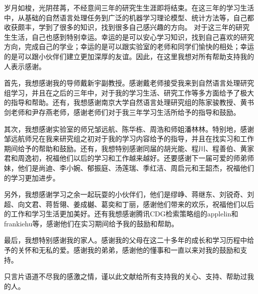 \documentclass[master]{njuthesis}
\begin{document}
\begin{acknowledgement}


岁月如梭，光阴荏苒，不经意间三年的研究生生涯即将结束。在这三年的学习生活中，从基础的自然语言处理任务到广泛的机器学习理论模型、统计方法等，自己都收获颇丰，学到了很多的知识，找到很多自己感兴趣的方向。 对于这三年的研究生生活，自己也感到特别幸运。幸运的是可以安心学习知识，找到自己喜欢的研究方向，完成自己的学业；幸运的是可以跟实验室的老师和同学们愉快的相处；幸运的是可以跟小伙伴们建立更加深厚的友谊。因此，在这里我想对所有帮助支持我的人表示感谢。

首先，我想感谢我的导师戴新宇副教授。感谢戴老师接受我来到自然语言处理研究组学习，并且在之后的三年中，对于我的学习生活、研究工作等多方面给予了极大的指导和帮助。还有，我想感谢南京大学自然语言处理研究组的陈家骏教授、黄书剑老师和尹存燕老师，感谢老师们对于我三年学习生活所给予的指导和鼓励。

其次，我想感谢实验室的师兄邹远航、陈华栋、周浩和师姐潘林林。特别地，感谢邹远航师兄在我来研究组之初对于我的学习内容给予的指导，并且在找实习和工作期间给予的帮助和鼓励。还有，我想特别感谢同届的胡光能、程川、程善伯、黄家君和周逸初，祝福他们以后的学习和工作越来越好。还要感谢下一届可爱的师弟师妹，他们是尚迪、李小婉、郁振庭、汤莲瑞、季红洁、周启元和王韶杰，祝福他们的学习更加进步。

另外，我想感谢学习之余一起玩耍的小伙伴们，他们是缪峥、蒋继东、刘锐奇、刘超、向文君、蒋哲翎、姜成樾、葛奕和丁丽，感谢他们带来的欢乐，祝福他们以后的工作和学习生活更加美好。还有我想感谢腾讯CDG检索策略组的applelin和frankiehu等，感谢他们在实习期间给予我的鼓励和帮助。

最后，我想特别感谢我的家人。感谢我的父母在这二十多年的成长和学习历程中给予的关怀和无私的爱。感谢我的弟弟，感谢他的懂事和一直以来对我的鼓励和支持。

只言片语道不尽我的感激之情，谨以此文献给所有支持我的关心、支持、帮助过我的人。


\end{acknowledgement}

\end{document}
